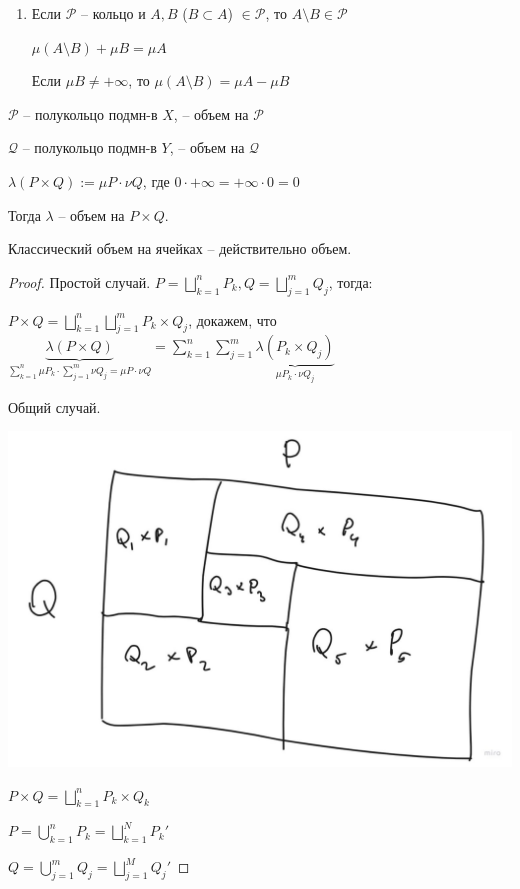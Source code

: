 \begin{remark}
    \begin{enumerate}
        \item {
            Если $\mathcal{P}$ -- кольцо и $A, B$ ($B \subset A$) $ \in \mathcal{P}$, то $A \setminus B \in \mathcal{P}$

            $\mu (A \setminus B) + \mu B = \mu A$

            Если $\mu B \neq +\infty$, то $\mu (A \setminus B) = \mu A - \mu B$
        }
    \end{enumerate}
\end{remark}

\begin{theorem}
    $\mathcal{P}$ -- полукольцо подмн-в $X$, \mu -- объем на $\mathcal{P}$

    $\mathcal{Q}$ -- полукольцо подмн-в $Y$, \nu -- объем на $\mathcal{Q}$

    $\lambda(P \times Q) := \mu P \cdot \nu Q$, где $0 \cdot +\infty = +\infty \cdot 0 = 0$

    Тогда $\lambda$ -- объем на $P \times Q$.
\end{theorem}
\begin{consequence}
    Классический объем на ячейках -- действительно объем.
\end{consequence}
\begin{proof}
    Простой случай. $P = \bigsqcup_{k=1}^{n}P_k, Q = \bigsqcup_{j=1}^m Q_j$, тогда:

    $P \times Q = \bigsqcup_{k=1}^{n} \bigsqcup_{j=1}^{m} P_k \times Q_j$, докажем, что $\underbrace{\lambda (P \times Q)}_{\sum_{k=1}^n \mu P_k \cdot \sum_{j=1}^m \nu Q_j = \mu P \cdot \nu Q} = \sum_{k=1}^n \sum_{j=1}^m \underbrace{\lambda (P_k \times Q_j)}_{\mu P_k \cdot \nu Q_j}$

    Общий случай.

    \begin{center}
        \includegraphics[scale=0.3]{./assets/01-measure-theory/PxQ.jpg}
    \end{center}

    $P \times Q = \bigsqcup_{k=1}^{n} P_k \times Q_k$
    
    $P = \bigcup_{k=1}^{n} P_k = \bigsqcup_{k=1}^{N} P_k'$

    $Q = \bigcup_{j=1}^{m} Q_j = \bigsqcup_{j=1}^{M} Q_j'$
\end{proof}

